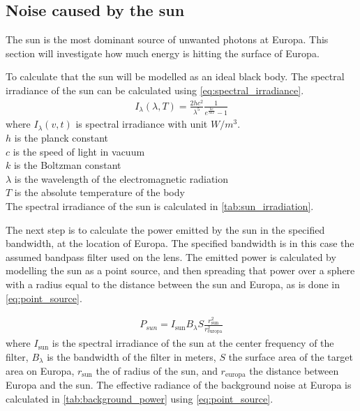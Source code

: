 \subsection{Noise caused by the sun}\label{ssec:background_noise}
The sun is the most dominant source of unwanted photons at Europa. This section will investigate how much energy is hitting the surface of Europa. 

To calculate that the sun will be modelled as an ideal black body. The spectral irradiance of the sun can be calculated using \cref{eq:spectral_irradiance}.
\begin{align}\label{eq:spectral_irradiance}
I_\lambda(\lambda,T) = \frac{2hc^2}{\lambda^5}\frac{1}{e^{\frac{hc}{\lambda kT}}-1}
\end{align}
where $I_\lambda(v,t)$ is spectral irradiance with unit $W/m^3$. \\
$h$ is the planck constant\\
$c$ is the speed of light in vacuum \\
$k$ is the Boltzman constant \\
$\lambda$ is the wavelength of the electromagnetic radiation\\
$T$ is the absolute temperature of the body\\



The spectral irradiance of the sun is calculated in \cref{tab:sun_irradiation}.



The next step is to calculate the power emitted by the sun in the specified bandwidth, at the location of Europa. The specified bandwidth is in this case the assumed bandpass filter used on the lens. The emitted power is calculated by modelling the sun as a point source, and then spreading that power over a sphere with a radius equal to the distance between the sun and Europa, as is done in \cref{eq:point_source}.

\begin{align}\label{eq:point_source}
    P_{sun} = I_{\text{sun}} B_\lambda S \frac{r_{\text{sun}}^2}{r_{\text{europa}}^2}
\end{align}
where $I_{\text{sun}}$ is the spectral irradiance of the sun at the center frequency of the filter, $B_\lambda$ is the bandwidth of the filter in meters, $S$ the surface area of the target area on Europa, $r_{\text{sun}}$ the of radius of the sun, and $r_{\text{europa}}$ the distance between Europa and the sun. The effective radiance of the background noise at Europa is calculated in \cref{tab:background_power} using \cref{eq:point_source}.

